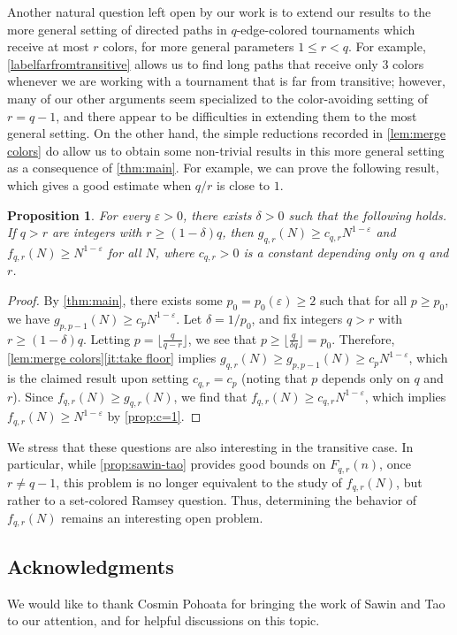 \documentclass[11pt,reqno]{amsart}
\newtheorem{proposition}[theorem]{Proposition}
\theoremstyle{definition}
\newcommand{\flo}[1]{\lfloor #1 \rfloor}
\newcommand\1{\mathbf{1}}
\let\leq\leqslant
\let\geq\geqslant
\begin{document}
Another natural question left open by our work is to extend our results to the more general setting of  directed paths in $q$-edge-colored tournaments which receive at most $r$ colors, for more general parameters $1 \leq r < q$. For example, \cref{labelfarfromtransitive} allows us to find long paths that receive only $3$ colors whenever we are working with a tournament that is far from transitive; however, many of our other arguments seem specialized to the color-avoiding setting of $r=q-1$, and there appear to be difficulties in extending them to the most general setting. On the other hand, the simple reductions recorded in \cref{lem:merge colors} do allow us to obtain some non-trivial results in this more general setting as a consequence of \cref{thm:main}. For example, we can prove the following result, which gives a good estimate when $q/r$ is close to $1$.
\begin{proposition}\label{prop:generalr}
    For every $\varepsilon>0$, there exists $\delta>0$ such that the following holds. If $q >r$ are integers with $r\geq (1-\delta)q$, then $g_{q,r}(N) \geq c_{q,r} N^{1-\varepsilon}$ and $f_{q,r}(N) \geq N^{1-\varepsilon}$ for all $N$, where $c_{q,r}>0$ is a constant depending only on $q$ and $r$.
\end{proposition}
\begin{proof}
    By \cref{thm:main}, there exists some $p_0=p_0(\varepsilon)\geq 2$ such that for all $p \geq p_0$, we have $g_{p,p-1}(N) \geq c_p N^{1-\varepsilon}$. Let $\delta = 1/p_0$, and fix integers $q>r$ with $r\geq (1-\delta)q$. Letting $p = \flo{\frac{q}{q-r}}$, we see that $p \geq \flo{\frac q{\delta q}} = p_0$. Therefore, \cref{lem:merge colors}\ref{it:take floor} implies $g_{q,r}(N) \geq g_{p,p-1}(N)\geq c_p N^{1-\varepsilon}$, which is the claimed result upon setting $c_{q,r}=c_p$ (noting that $p$ depends only on $q$ and $r$). Since $f_{q,r}(N)\geq g_{q,r}(N)$, we find that $f_{q,r}(N) \geq c_{q,r}N^{1-\varepsilon}$, which implies $f_{q,r}(N) \geq N^{1-\varepsilon}$ by \cref{prop:c=1}.
\end{proof}
We stress that these questions are also interesting in the transitive case. In particular, while \cref{prop:sawin-tao} provides good bounds on $F_{q,r}(n)$, once $r \neq q-1$, this problem is no longer equivalent to the study of $f_{q,r}(N)$, but rather to a set-colored Ramsey question. Thus, determining the behavior of $f_{q,r}(N)$ remains an interesting open problem.

\subsection*{Acknowledgments} We would like to thank Cosmin Pohoata for bringing the work of Sawin and Tao to our attention, and for helpful discussions on this topic.


\end{document}
